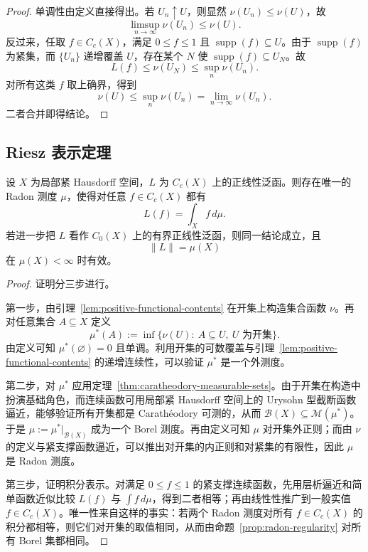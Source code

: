 \begin{proof}
单调性由定义直接得出。若 $U_n\uparrow U$，则显然 $\nu(U_n)\le \nu(U)$，故
\[
\limsup_{n\to\infty}\nu(U_n)\le \nu(U).
\]
反过来，任取 $f\in C_c(X)$，满足 $0\le f\le1$ 且 $\operatorname{supp}(f)\subseteq U$。由于 $\operatorname{supp}(f)$ 为紧集，而 $\{U_n\}$ 递增覆盖 $U$，存在某个 $N$ 使 $\operatorname{supp}(f)\subseteq U_N$。故
\[
L(f)\le \nu(U_N)\le \sup_n \nu(U_n).
\]
对所有这类 $f$ 取上确界，得到
\[
\nu(U)\le \sup_n \nu(U_n)=\lim_{n\to\infty}\nu(U_n).
\]
二者合并即得结论。
\end{proof}

\subsection{Riesz 表示定理}

\begin{theorem}\label{thm:riesz-representation}
设 $X$ 为局部紧 Hausdorff 空间，$L$ 为 $C_c(X)$ 上的正线性泛函。则存在唯一的 Radon 测度 $\mu$，使得对任意 $f\in C_c(X)$ 都有
\[
L(f)=\int_X f\,d\mu.
\]
若进一步把 $L$ 看作 $C_0(X)$ 上的有界正线性泛函，则同一结论成立，且
\[
\|L\|=\mu(X)
\]
在 $\mu(X)<\infty$ 时有效。
\end{theorem}

\begin{proof}
证明分三步进行。

第一步，由引理~\ref{lem:positive-functional-contents} 在开集上构造集合函数 $\nu$。再对任意集合 $A\subseteq X$ 定义
\[
\mu^\ast(A):=\inf\{\nu(U):\ A\subseteq U,\ U\text{ 为开集}\}.
\]
由定义可知 $\mu^\ast(\varnothing)=0$ 且单调。利用开集的可数覆盖与引理~\ref{lem:positive-functional-contents} 的递增连续性，可以验证 $\mu^\ast$ 是一个外测度。

第二步，对 $\mu^\ast$ 应用定理~\ref{thm:caratheodory-measurable-sets}。由于开集在构造中扮演基础角色，而连续函数可用局部紧 Hausdorff 空间上的 Urysohn 型截断函数逼近，能够验证所有开集都是 Carathéodory 可测的，从而 $\mathcal B(X)\subseteq \mathscr M(\mu^\ast)$。于是 $\mu:=\mu^\ast|_{\mathcal B(X)}$ 成为一个 Borel 测度。再由定义可知 $\mu$ 对开集外正则；而由 $\nu$ 的定义与紧支撑函数逼近，可以推出对开集的内正则和对紧集的有限性，因此 $\mu$ 是 Radon 测度。

第三步，证明积分表示。对满足 $0\le f\le1$ 的紧支撑连续函数，先用层析逼近和简单函数近似比较 $L(f)$ 与 $\int f\,d\mu$，得到二者相等；再由线性性推广到一般实值 $f\in C_c(X)$。唯一性来自这样的事实：若两个 Radon 测度对所有 $f\in C_c(X)$ 的积分都相等，则它们对开集的取值相同，从而由命题~\ref{prop:radon-regularity} 对所有 Borel 集都相同。
\end{proof}

